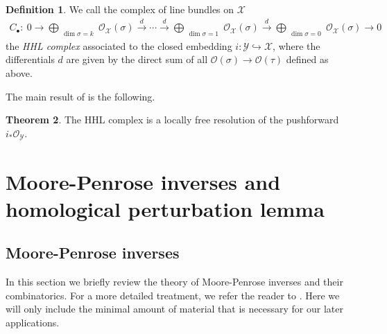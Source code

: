 \documentclass[11pt,reqno]{amsart}
\theoremstyle{definition}
\newtheorem{theorem}{Theorem}[section]
\newtheorem{definition}[theorem]{Definition}
\numberwithin{equation}{section}
\begin{document}
\smallskip

\begin{definition}
    We call the complex of line bundles on $\mathcal{X}$ 
    \begin{align}\label{eq-HHL-complex}
        C_{\bullet}:\ 0\rightarrow\bigoplus_{\substack{\dim\sigma=k }} \mathcal{O}_{\mathcal{X}}(\sigma) \xrightarrow{d} \cdots \xrightarrow{d} \bigoplus_{\substack{\dim\sigma=1}} \mathcal{O}_{\mathcal{X}}(\sigma) \xrightarrow{d} \bigoplus_{\substack{\dim\sigma=0}} \mathcal{O}_{\mathcal{X}}(\sigma)\rightarrow0
    \end{align}
    the \textit{HHL complex} associated to the closed embedding $i:\mathcal{Y}\hookrightarrow \mathcal{X}$, where the differentials $d$ are given by the direct sum of all $\mathcal{O}(\sigma)\rightarrow\mathcal{O}(\tau)$ defined as above.
\end{definition}



\smallskip

The main result of \cite{HHL} is the following.
\begin{theorem}\label{thm:HHL}
    The HHL complex is a locally free resolution of the pushforward $i_*\mathcal{O}_{\mathcal{Y}}$.
\end{theorem}


\smallskip

\section{Moore-Penrose inverses and homological perturbation lemma}\label{sec:MP-HPL}

\subsection{Moore-Penrose inverses}\label{subsec:MP-inverses}

In this section we briefly review the theory of Moore-Penrose inverses and their combinatorics. For a more detailed treatment, we refer the reader to \cite{EMO}. Here we will only include the minimal amount of material that is necessary for our later applications.

\smallskip
\end{document}

